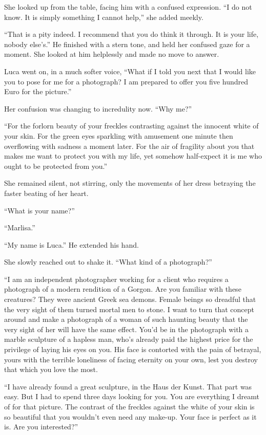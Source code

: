 She looked up from the table, facing him with a confused expression. ``I do not know. It is simply something I cannot help,'' she added meekly.

``That is a pity indeed. I recommend that you do think it through. It is your life, nobody else's.'' He finished with a stern tone, and held her confused gaze for a moment. She looked at him helplessly and made no move to answer.

Luca went on, in a much softer voice, ``What if I told you next that I would like you to pose for me for a photograph? I am prepared to offer you five hundred Euro for the picture.''

Her confusion was changing to incredulity now. ``Why me?''

``For the forlorn beauty of your freckles contrasting against the innocent white of your skin. For the green eyes sparkling with amusement one minute then overflowing with sadness a moment later. For the air of fragility about you that makes me want to protect you with my life, yet somehow half-expect it is me who ought to be protected from you.''

She remained silent, not stirring, only the movements of her dress betraying the faster beating of her heart.

``What is your name?''

``Marlisa.''

``My name is Luca.'' He extended his hand.

She slowly reached out to shake it. ``What kind of a photograph?''

``I am an independent photographer working for a client who requires a photograph of a modern rendition of a Gorgon. Are you familiar with these creatures? They were ancient Greek sea demons. Female beings so dreadful that the very sight of them turned mortal men to stone. I want to turn that concept around and make a photograph of a woman of such haunting beauty that the very sight of her will have the same effect. You'd be in the photograph with a marble sculpture of a hapless man, who's already paid the highest price for the privilege of laying his eyes on you. His face is contorted with the pain of betrayal, yours with the terrible loneliness of facing eternity on your own, lest you destroy that which you love the most.

``I have already found a great sculpture, in the Haus der Kunst. That part was easy. But I had to spend three days looking for you. You are everything I dreamt of for that picture. The contrast of the freckles against the white of your skin is so beautiful that you wouldn't even need any make-up. Your face is perfect as it is. Are you interested?''

